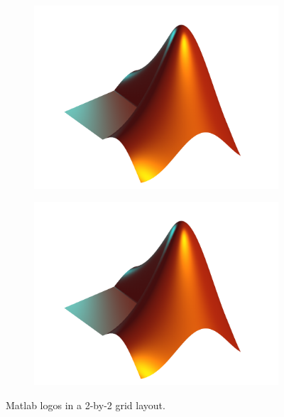 \begin{figure}[H]
\begin{subfigure}[b]{\twofig\textwidth}
			\includegraphics{../matlab/fig/examples/matlab-logo-with-ffsp.pdf}
		\end{subfigure}
		\hfil
		\begin{subfigure}[b]{\twofig\textwidth}
			\includegraphics{../matlab/fig/examples/matlab-logo-with-ffsp.pdf}
		\end{subfigure}
		\caption{Matlab logos in a \num{2}-by-\num{2} grid layout. \label{fig:2-by-2}}
	\end{figure}
		
